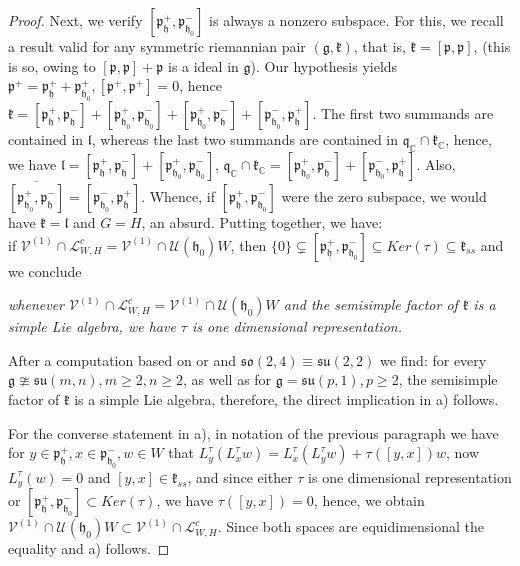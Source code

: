 \documentclass[12pt]{amsart}
\theoremstyle{definition}
\theoremstyle{remark}
\newcommand{\g}{\mathfrak{g}}
\newcommand{\h}{\mathfrak{h}}
\renewcommand{\k}{{\mathfrak k}}
\renewcommand{\l}{\mathfrak l}
\newcommand{\p}{\mathfrak p}
\newcommand{\q}{\mathfrak q}
\newcommand{\C}{{\mathbb C}}
\numberwithin{equation}{section}
\begin{document}
\begin{proof}
 Next, we verify $[\p_\h^+,\p_{\h_0}^-]$ is always a nonzero subspace. For this, we recall a result valid for any symmetric riemannian pair $(\g,\k)$, that is,  $\k=[\p,\p]$, (this is so, owing to $[\p,\p]+\p$ is a ideal in $\g$). Our hypothesis yields  $\p^+=\p_\h^+ +\p_{\h_0}^+, [\p^+,\p^+]=0$, hence $\k=[\p_\h^+,\p_\h^-]+[\p_{\h_0}^+,\p_{\h_0}^-]+[\p_{\h_0}^+,\p_{\h}^-]
 +[\p_{\h_0}^-,\p_{\h}^+]$.  The first two summands are  contained in $\l$, whereas the last two summands are contained in $\q_\C \cap \k_\C$, hence, we have $\l=[\p_\h^+,\p_\h^-]+[\p_{\h_0}^+,\p_{\h_0}^-]$, $\q_\C \cap \k_\C=[\p_{\h_0}^+,\p_{\h}^-]
+[\p_{\h_0}^-,\p_{\h}^+]$. Also,  $\overline{[\p_{\h_0}^+,\p_{\h}^-]}
 =[\p_{\h_0}^-,\p_{\h}^+]$. Whence, if $[\p_\h^+,\p_{\h_0}^-]$ were the zero subspace, we would have $\k=\l$ and $G=H$, an absurd. Putting together,  we have: \\ if  $ \mathcal V^{(1)}\cap \mathcal L_{W,H}^c =  \mathcal V^{(1)}\cap \mathcal U(\h_0)W$,  then  $\{0\}\subsetneq [\p_\h^+,\p_{\h_0}^-]
\subseteq Ker(\tau) \subseteq \k_{ss}$ and we conclude


\noindent
     {\it whenever   $ \mathcal V^{(1)}\cap \mathcal L_{W,H}^c  =  \mathcal V^{(1)}\cap \mathcal  U(\h_0)W$  and the semisimple factor of $\k$ is a simple Lie algebra, we have $ \tau $ is one dimensional representation.}



\smallskip
 After a computation based on  \cite[Table 3]{Va} \cite[Table 3 ]{OV3} or \cite[Table 3]{KOadv} and $\mathfrak{so}(2,4)\equiv \mathfrak{su}(2,2) $ we find: for every $\g\ncong \mathfrak{su}(m,n), m\geq 2, n\geq 2$, as well as for  $\g=\mathfrak{su}(p,1), p\geq 2$, the semisimple factor of  $\k$ is a simple Lie algebra, therefore,  the direct implication in a) follows.

   For the converse statement in a),   in notation of the previous paragraph we have for $ y\in \p_{\h}^+,   x \in \p_{\h_0}^-,   w\in W$ that  $L_y^\tau (L_x^\tau w)=L_x^\tau(L_y^\tau w)+\tau([y,x])w$, now $L_y^\tau (w)=0$ and $[y,x]\in \k_{ss}$,  and since either $\tau$ is one dimensional representation or $[\p_{\h}^+,  \p_{\h_0}^-] \subset Ker(\tau)$, we have $\tau([y,x])=0$, hence, we obtain $ \mathcal V^{(1)}\cap \mathcal U(\h_0)W \subset   \mathcal V^{(1)}\cap \mathcal L_{W,H}^c$. Since both spaces are equidimensional  the   equality and  a) follows.



\end{proof}
\end{document}
